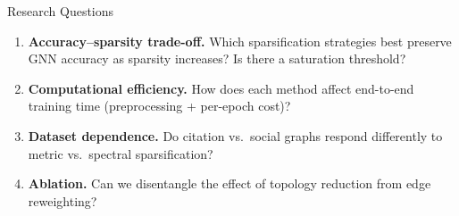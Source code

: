 \documentclass[aspectratio=169]{beamer}
\begin{document}
\begin{frame}{\faSearch \quad Research Questions}
    \begin{enumerate}\setlength{\itemsep}{6pt}
        \item \textbf{\textcolor{cyanneon}{Accuracy--sparsity trade-off.}} Which sparsification strategies best preserve GNN accuracy as sparsity increases? Is there a saturation threshold?
        \item \textbf{\textcolor{cyanneon}{Computational efficiency.}} How does each method affect end-to-end training time (preprocessing + per-epoch cost)?
        \item \textbf{\textcolor{cyanneon}{Dataset dependence.}} Do citation vs.\ social graphs respond differently to metric vs.\ spectral sparsification?
        \item \textbf{\textcolor{cyanneon}{Ablation.}} Can we disentangle the effect of topology reduction from edge reweighting?
    \end{enumerate}
\end{frame}
\end{document}
